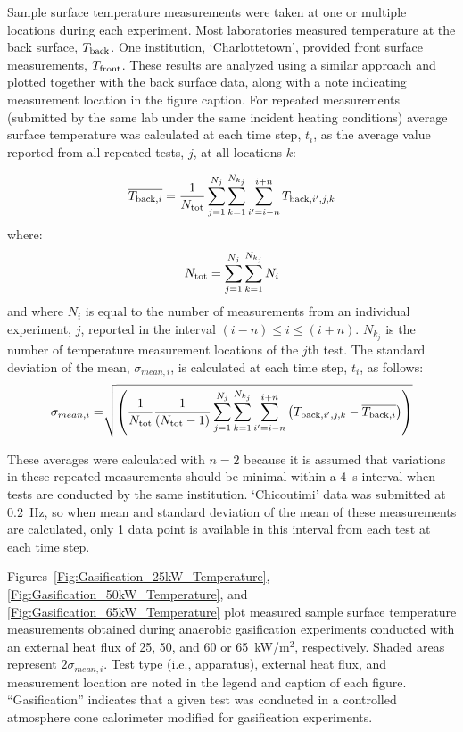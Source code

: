 \documentclass{book}
\begin{document}
Sample surface temperature measurements were taken at one or multiple locations during each experiment. Most laboratories measured temperature at the back surface, $T_{\rm back}$. One institution, ‘Charlottetown’, provided front surface measurements, $T_{\rm front}$. These results are analyzed using a similar approach and plotted together with the back surface data, along with a note indicating measurement location in the figure caption. For repeated measurements (submitted by the same lab under the same incident heating conditions) average surface temperature was calculated at each time step, $t_i$, as the average value reported from all repeated tests, $j$, at all locations $k$:

\begin{equation}
  \overline{ T_{{\rm back},i} } = \frac{1}{N_{\rm tot}} \sum_{j=1}^{N_j} \sum_{k=1}^{N_{k_j}} \sum_{i'=i-n}^{i+n} T_{{\rm back},i',j,k}
\end{equation}
where:
\begin{equation}
N_{\rm tot}={\sum_{j=1}^{N_j}\sum_{k=1}^{N_{k_j}}N_i}
\end{equation}
and where $N_i$ is equal to the number of measurements from an individual experiment, $j$, reported in the interval $(i-n) \leq i \leq (i+n)$. $N_{k_j}$ is the number of temperature measurement locations of the $j$th test. The standard deviation of the mean, $\sigma_{mean,i}$, is calculated at each time step, $t_i$, as follows:
\begin{equation}
   \sigma_{mean,i} = \sqrt[]{ \left( \frac{1}{N_{\rm tot}} \frac{1}{(N_{\rm tot}-1)}
    \sum_{j=1}^{N_j} \sum_{k=1}^{N_{k_j}} \sum_{i'=i-n}^{i+n} \left( T_{{\rm back},i',j,k} - \overline{ T_{{\rm back},i} }  \right) \right)}
\end{equation}


These averages were calculated with $n=2$ because it is assumed that variations in these repeated measurements should be minimal within a 4~s interval when tests are conducted by the same institution. ‘Chicoutimi’ data was submitted at 0.2~Hz, so when mean and standard deviation of the mean of these measurements are calculated, only 1 data point is available in this interval from each test at each time step.

Figures~\ref{Fig:Gasification_25kW_Temperature}, \ref{Fig:Gasification_50kW_Temperature}, and \ref{Fig:Gasification_65kW_Temperature} plot measured sample surface temperature measurements obtained during anaerobic gasification experiments conducted with an external heat flux of 25, 50, and 60 or 65~kW/m$^2$, respectively. Shaded areas represent $2\sigma_{mean,i}$. Test type (i.e., apparatus), external heat flux, and measurement location are noted in the legend and caption of each figure. ``Gasification'' indicates that a given test was conducted in a controlled atmosphere cone calorimeter modified for gasification experiments.
\end{document}
